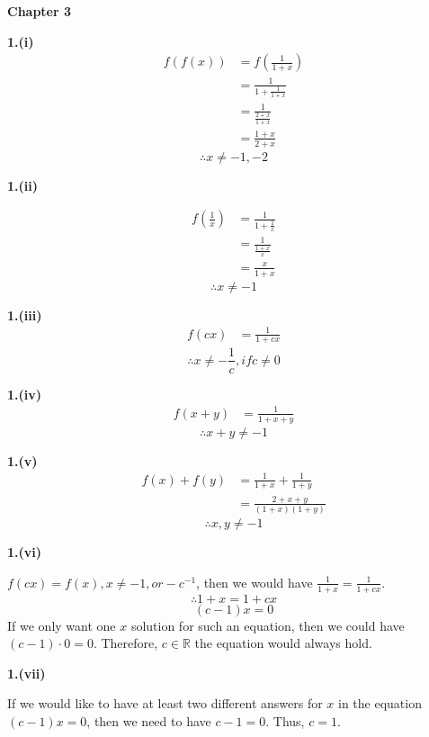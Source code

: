 \documentclass[a4paper,12pt]{report}
\begin{document}
\pagebreak
\noindent
\textbf{Chapter 3}

\noindent
\textbf{1.(i)}
\begin{align*}
f(f(x))
&=f(\frac{1}{1+x})\\
&=\frac{1}{1+\frac{1}{1+x}}\\
&=\frac{1}{\frac{2+x}{1+x}}\\
&=\frac{1+x}{2+x}
\end{align*}
\[\therefore x\neq -1,-2\]

\noindent
\textbf{1.(ii)}

\begin{align*}
f(\frac{1}{x})
&=\frac{1}{1+\frac{1}{x}}\\
&=\frac{1}{\frac{1+x}{x}}\\
&=\frac{x}{1+x}
\end{align*}
\[\therefore x\neq -1\]

\noindent
\textbf{1.(iii)}
\begin{align*}
f(cx)
&=\frac{1}{1+cx}
\end{align*}
\[\therefore x\neq -\frac{1}{c}, if c\neq 0\]

\noindent
\textbf{1.(iv)}
\begin{align*}
f(x+y)
&=\frac{1}{1+x+y}
\end{align*}
\[\therefore x+y\neq -1\]

\noindent
\textbf{1.(v)}
\begin{align*}
f(x)+f(y)
&=\frac{1}{1+x}+\frac{1}{1+y}\\
&=\frac{2+x+y}{(1+x)(1+y)}
\end{align*}
\[\therefore x,y\neq -1\]

\noindent
\textbf{1.(vi)}

\noindent
$f(cx)=f(x), x\neq -1, or -c^{-1}$, then we would have $\frac{1}{1+x}=\frac{1}{1+cx}$.
\[\therefore 1+x=1+cx\]
\[(c-1)x=0\]
If we only want one $x$ solution for such an equation, then we could have $(c-1)\cdot{0}=0$. Therefore, $c\in \mathbb{R}$ the equation would always hold. 

\noindent
\textbf{1.(vii)}

\noindent
If we would like to have at least two different answers for $x$ in the equation $(c-1)x=0$, then we need to have $c-1=0$. Thus, $c=1$. 
\end{document}
